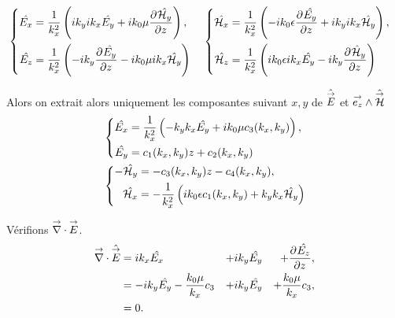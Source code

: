   \begin{align*}
  &\left\lbrace
    \begin{aligned}
      \hat{E_x} &= \frac{1}{k_x^2}\left(ik_yik_x\hat{E_y} + ik_0\mu\ddr{z}{\hat{\cH_y}}\right),
      \\
      \hat{E_z} &= \frac{1}{k_x^2}\left(-ik_y\ddr{z}{\hat{E_y}}-ik_0\mu ik_x\hat{\cH_y}\right)
    \end{aligned}
  \right.    
  &&
  \left\lbrace
    \begin{aligned}
      \hat{\cH_x} &= \frac{1}{k_x^2}\left(-ik_0\eps\ddr{z}{\hat{E_y}} + ik_yik_x\hat{\cH_y}\right),
      \\
      \hat{\cH_z} &= \frac{1}{k_x^2}\left(ik_0\eps ik_x \hat{E_y} - ik_y \ddr{z}{\hat{\cH}_y} \right)
    \end{aligned}
    \right.
  \end{align*}

  Alors on extrait alors uniquement les composantes suivant \(x,y\) de \(\hat{\vE}\) et \(\vect{e_z} \pvect \hat{\vH}\)
  \begin{align*}
  &\left\lbrace
    \begin{aligned}
      \hat{E_x} &= \frac{1}{k_x^2}\left(-k_yk_x\hat{E_y} + ik_0\mu c_3(k_x,k_y)\right),
      \\
      \hat{E_y} &= c_1(k_x,k_y)z + c_2(k_x,k_y)
    \end{aligned}
  \right.    
  \\&
  \left\lbrace
    \begin{aligned}
      -\hat{\cH_y} &= -c_3(k_x,k_y)z - c_4(k_x,k_y),
      \\
      \hat{\cH_x} &= -\frac{1}{k_x^2}\left(ik_0\eps c_1(k_x,k_y) + k_yk_x\hat{\cH_y}\right)
    \end{aligned}
    \right.
  \end{align*}

  Vérifions \(\vdiv\vE\).
  \begin{align*}
    \vdiv{\hat{\vE}} &= ik_x\hat{E_x} &+ ik_y\hat{E_y} &&+ \ddr{z}{\hat{E_z}},
    \\
    &= -ik_y\hat{E_y} - \frac{k_0\mu}{k_x}c_3 &+ ik_y \hat{E_y} &&+ \frac{k_0\mu}{k_x}c_3,
    \\
    &= 0.
  \end{align*}




